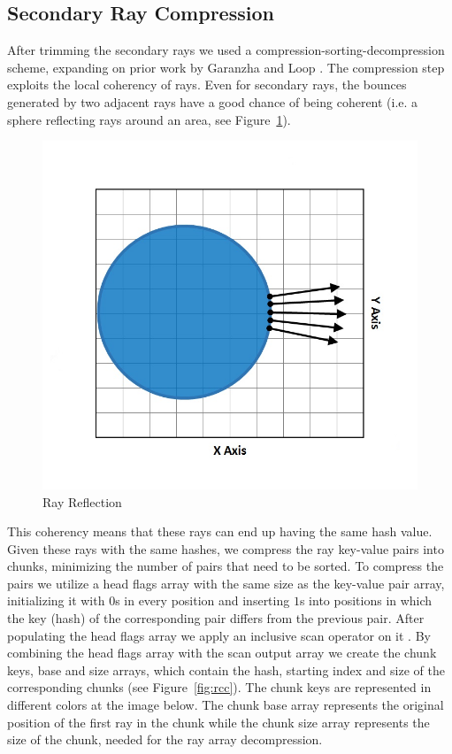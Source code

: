 \subsection{Secondary Ray Compression}

After trimming the secondary rays we used a compression-sorting-decompression scheme, expanding on prior work by Garanzha and Loop \cite{Garanzha10}. The compression step exploits the local coherency of rays. Even for secondary rays, the bounces generated by two adjacent rays have a good chance of being coherent (i.e. a sphere reflecting rays around an area, see Figure~\ref{fig:rr}). 

\begin{figure}[!htb]
    \centering
    \includegraphics[scale=0.325]{Images/Ray_Reflection}
    \caption{\label{fig:rr}Ray Reflection}
\end{figure}

This coherency means that these rays can end up having the same hash value. Given these rays with the same hashes, we compress the ray key-value pairs into chunks, minimizing the number of pairs that need to be sorted. To compress the pairs we utilize a head flags array with the same size as the key-value pair array, initializing it with $0$s in every position and inserting $1$s into positions in which the key (hash) of the corresponding pair differs from the previous pair. After populating the head flags array we apply an inclusive scan operator on it \cite{Merrill09}. By combining the head flags array with the scan output array we create the chunk keys, base and size arrays, which contain the hash, starting index and size of the corresponding chunks (see Figure~\ref{fig:rcc}). The chunk keys are represented in different colors at the image below. The chunk base array represents the original position of the first ray in the chunk while the chunk size array represents the size of the chunk, needed for the ray array decompression.

